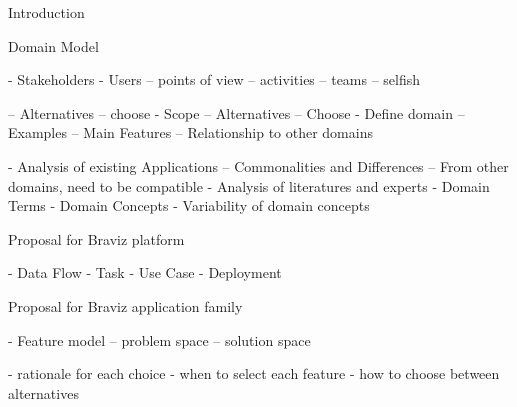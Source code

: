 Introduction



Domain Model

- Stakeholders
- Users
-- points of view
-- activities
-- teams
-- selfish

-- Alternatives
-- choose
- Scope
-- Alternatives
-- Choose
- Define domain
-- Examples
-- Main Features
-- Relationship to other domains

- Analysis of existing Applications
-- Commonalities and Differences
-- From other domains, need to be compatible
- Analysis of literatures and experts
- Domain Terms
- Domain Concepts
- Variability of domain concepts




Proposal for Braviz platform

- Data Flow
- Task 
- Use Case
- Deployment


Proposal for Braviz application family

- Feature model
-- problem space
-- solution space



- rationale for each choice
- when to select each feature
- how to choose between alternatives
